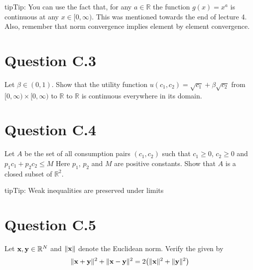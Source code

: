 \documentclass[letterpaper,10pt,english]{jupyterBook}
\begin{document}
\begin{sphinxadmonition}{tip}{Tip:}
\sphinxAtStartPar
You can use the fact that, for any \(a \in \mathbb{R}\) the function \(g(x) = x^a\) is continuous at any \(x \in [0,\infty)\). This was mentioned towards the end of lecture 4.
Also, remember that norm convergence implies element by element convergence.
\end{sphinxadmonition}


\section{Question C.3}
\label{\detokenize{04.exercises:question-c-3}}
\sphinxAtStartPar
Let \(\beta \in (0,1)\). Show that the utility function \(u(c_1,c_2) = \sqrt{c_1} + \beta \sqrt{c_2}\) from \([0,\infty) \times [0,\infty)\) to \(\mathbb{R}\) to \(\mathbb{R}\) is continuous everywhere in its domain.


\section{Question C.4}
\label{\detokenize{04.exercises:question-c-4}}
\sphinxAtStartPar
Let \(A\) be the set of all consumption pairs \((c_1,c_2)\) such that \(c_1 \ge 0\), \(c_2 \ge 0\) and \(p_1 c_1 + p_2 c_2 \le M\) Here \(p_1\), \(p_2\) and \(M\) are positive constants. Show that \(A\) is a closed subset of \(\mathbb{R}^2\).

\begin{sphinxadmonition}{tip}{Tip:}
\sphinxAtStartPar
Weak inequalities are preserved under limits
\end{sphinxadmonition}


\section{Question C.5}
\label{\detokenize{04.exercises:question-c-5}}
\sphinxAtStartPar
Let \({\bf x}, {\bf y} \in \mathbb{R}^N\) and \(\| {\bf x} \| \) denote the Euclidean norm.  Verify the  given by
\begin{equation*}
\begin{split}
\| {\bf x} + {\bf y} \|^2 + \| {\bf x} - {\bf y} \|^2 = 2 \big( \| {\bf x} \|^2 + \| {\bf y} \|^2 \big)
\end{split}
\end{equation*}






\renewcommand{\indexname}{Index}
\printindex
\end{document}
